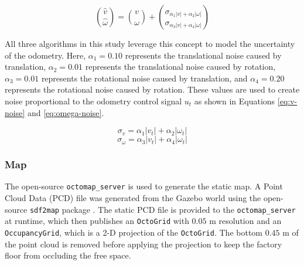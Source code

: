 \begin{equation}\label{eq:motion-noise}
    \binom{\hat{v}}{\hat{\omega}} = \binom{v}{\omega} + \binom{\sigma_{\alpha_1 \left\lvert v \right\rvert + \alpha_2 \left\lvert \omega \right\rvert}}{\sigma_{\alpha_3 \left\lvert v \right\rvert + \alpha_4 \left\lvert \omega \right\rvert}}
\end{equation}

All three algorithms in this study leverage this concept to model the uncertainty of the odometry.
Here, $\alpha_1=0.10$ represents the translational noise caused by translation, $\alpha_2=0.01$ represents the translational noise caused by rotation, $\alpha_3=0.01$ represents the rotational noise caused by translation, and $\alpha_4=0.20$ represents the rotational noise caused by rotation.
These values are used to create noise proportional to the odometry control signal $u_t$ as shown in Equations \ref{eq:v-noise} and \ref{eq:omega-noise}.

\begin{equation}\label{eq:v-noise}
\sigma_v = \alpha_1 |v_t| + \alpha_2 |\omega_t|
\end{equation}
\begin{equation}\label{eq:omega-noise}
\sigma_\omega = \alpha_3 |v_t| + \alpha_4 |\omega_t|
\end{equation}

\subsubsection{Map}
The open-source \texttt{octomap\_server} \cite{hornung2013octomap} is used to generate the static map.
A Point Cloud Data (PCD) file was generated from the Gazebo world using the open-source \texttt{sdf2map} package \cite{sdf2map}.
The static PCD file is provided to the \texttt{octomap\_server} at runtime, which then publishes an \texttt{OctoGrid} with $0.05$ m resolution and an \texttt{OccupancyGrid}, which is a 2-D projection of the \texttt{OctoGrid}.
The bottom $0.45$ m of the point cloud is removed before applying the projection to keep the factory floor from occluding the free space.